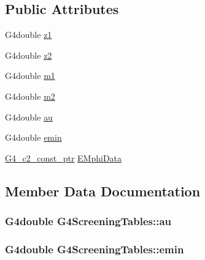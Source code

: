 \subsection*{Public Attributes}
\begin{DoxyCompactItemize}
\item 
G4double \hyperlink{structG4ScreeningTables_a3cd98934fae4a889ab4e53f3864cc780}{z1}
\item 
G4double \hyperlink{structG4ScreeningTables_a4284a519e4baf655b8d90447fcda3121}{z2}
\item 
G4double \hyperlink{structG4ScreeningTables_a37e3971aed34265cd4934f36c11691f3}{m1}
\item 
G4double \hyperlink{structG4ScreeningTables_a174aca594aef6e3106d5c372f40e0d84}{m2}
\item 
G4double \hyperlink{structG4ScreeningTables_a448ed1d75168ff3acf294d90eca426a4}{au}
\item 
G4double \hyperlink{structG4ScreeningTables_a747dce80213771fde265e770670a4d7f}{emin}
\item 
\hyperlink{G4ScreenedNuclearRecoil_8hh_a1252ac0bd90119ed9cc3298296b77c2a}{G4\+\_\+c2\+\_\+const\+\_\+ptr} \hyperlink{structG4ScreeningTables_a79e3cd8918c5e27e1f15e43ac0f42a5b}{E\+Mphi\+Data}
\end{DoxyCompactItemize}


\subsection{Member Data Documentation}
\subsubsection[{\texorpdfstring{au}{au}}]{\setlength{\rightskip}{0pt plus 5cm}G4double G4\+Screening\+Tables\+::au}\hypertarget{structG4ScreeningTables_a448ed1d75168ff3acf294d90eca426a4}{}\label{structG4ScreeningTables_a448ed1d75168ff3acf294d90eca426a4}
\subsubsection[{\texorpdfstring{emin}{emin}}]{\setlength{\rightskip}{0pt plus 5cm}G4double G4\+Screening\+Tables\+::emin}\hypertarget{structG4ScreeningTables_a747dce80213771fde265e770670a4d7f}{}\label{structG4ScreeningTables_a747dce80213771fde265e770670a4d7f}
